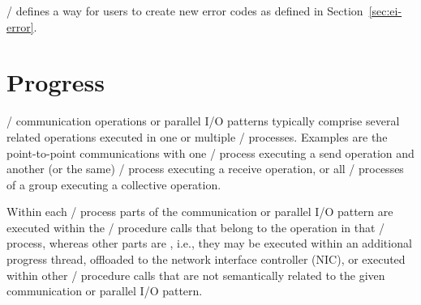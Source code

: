 \MPI/
defines a way for users to create new error codes as defined
in Section~\ref{sec:ei-error}.


\section{Progress}
%
\label{subsec:terms:progress}


\MPI/ communication operations or parallel I/O patterns typically comprise several
related operations executed in one or multiple \MPI/ processes.
Examples are the point-to-point communications with one \MPI/ process executing a
send operation and another (or the same) \MPI/ process executing a receive operation,
or all \MPI/ processes of a group executing a collective operation.

Within each \MPI/ process parts of the communication or parallel I/O pattern are
executed within the \MPI/ procedure calls that belong to the operation in
that \MPI/ process, whereas other parts are
,
i.e., they may be executed within an additional progress thread,
offloaded to the network interface controller (NIC),
or executed within other \MPI/ procedure calls that are not semantically
related to the given communication or parallel I/O pattern.


